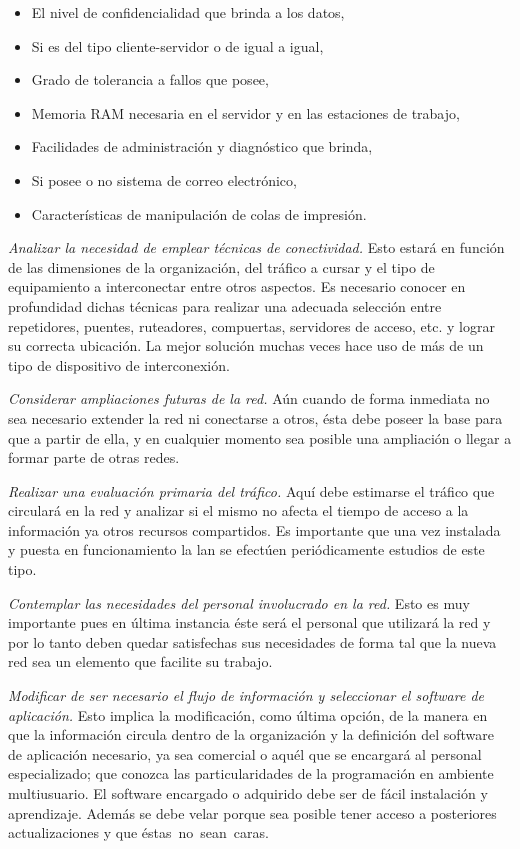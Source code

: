 \begin{itemize}
\item El nivel de confidencialidad que brinda a los datos,
\item Si es del tipo cliente-servidor o de igual a igual,
\item Grado de tolerancia a fallos que posee,
\item Memoria RAM necesaria en el servidor y en las estaciones de trabajo,
\item Facilidades de administración y diagnóstico que brinda,
\item Si posee o no sistema de correo electrónico,
\item Características de manipulación de colas de impresión.
\end{itemize}

\textit{Analizar la necesidad de emplear técnicas de conectividad.} Esto estará en función de las dimensiones de la organización, del tráfico a cursar y el tipo de equipamiento a interconectar entre otros aspectos. Es necesario conocer en profundidad dichas técnicas para realizar una adecuada selección entre repetidores, puentes, ruteadores, compuertas, servidores de acceso, etc. y lograr su correcta ubicación. La mejor solución muchas veces hace uso de más de un tipo de dispositivo de interconexión.

\textit{Considerar ampliaciones futuras de la red.} Aún cuando de forma inmediata no sea necesario extender la red ni conectarse a otros, ésta debe poseer la base para que a partir de ella, y en cualquier momento sea posible una ampliación o llegar a formar parte de otras redes.

\textit{Realizar una evaluación primaria del tráfico.} Aquí debe estimarse el tráfico que circulará en la red y analizar si el mismo no afecta el tiempo de acceso a la información ya otros recursos compartidos. Es importante que una vez instalada y puesta en funcionamiento la \gls{lan} se efectúen periódicamente estudios de este tipo.

\textit{Contemplar las necesidades del personal involucrado en la red.} Esto es muy importante pues en última instancia éste será el personal que utilizará la red y por lo tanto deben quedar satisfechas sus necesidades de forma tal que la nueva red sea un elemento que facilite su trabajo.

\textit{Modificar de ser necesario el flujo de información y seleccionar el software de aplicación.} Esto implica la modificación, como última opción, de la manera en que la información circula dentro de la organización y la definición del software de aplicación necesario, ya sea comercial o aquél que se encargará al personal especializado; que conozca las particularidades de la programación en ambiente multiusuario. El software encargado o adquirido debe ser de fácil instalación y aprendizaje. Además se debe velar porque sea posible tener acceso a posteriores actualizaciones y que éstas no sean caras.
